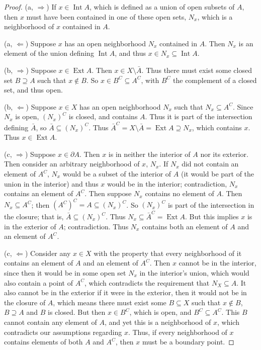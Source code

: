 \documentclass{article}
\theoremstyle{definition}
\begin{document}
\begin{proof}
(a, $\Rightarrow$) 
If $x \in \operatorname{Int} A$, which is defined as a 
union of open subsets of $A$, then $x$ must have been contained in one of 
these open sets, $N_x$, which is a neighborhood of $x$ contained in $A$.

(a, $\Leftarrow$) 
Suppose $x$ has an open neighborhood $N_x$ contained in $A$. 
Then $N_x$ is an element of the union defining $\operatorname{Int} A$, and 
thus $ x \in N_x \subseteq \operatorname{Int} A$.

(b, $\Rightarrow$)
Suppose $x \in \operatorname{Ext} A$. Then $x \in X \setminus \bar{A}$. Thus
there must exist some closed set $B \supseteq A$ such that $x \not\in B$.
So $x \in B^C \subseteq A^C$, with $B^C$ the complement of a closed set, and thus
open.

(b, $\Leftarrow$)
Suppose $x \in X$ has an open neighborhood $N_x$ such that $N_x \subseteq A^C$. 
Since $N_x$ is open, $(N_x)^C$ is closed, and contains $A$. Thus it is part
of the intersection defining $\bar{A}$, so
$\bar{A} \subseteq (N_x)^C$. Thus $\bar{A}^C = X \setminus \bar{A} 
=\operatorname{Ext} A \supseteq N_x$, which contains $x$. Thus
$x \in \operatorname{Ext} A$.

(c, $\Rightarrow$)
Suppose $x \in \partial A$. Then $x$ is in neither the interior of $A$ nor
its exterior. Then consider an arbitrary neighborhood of $x$, $N_x$. If 
$N_x$ did not contain an element of $A^C$, $N_x$ would be a subset
of the interior of $A$ (it would be part of the union in the interior) 
and thus $x$ would be in the interior; contradiction, $N_x$ contains
an element of $A^C$. Then suppose $N_x$ contains no element of $A$. Then 
$N_x \subseteq A^C$; then $(A^C)^C = A \subseteq (N_x)^C$. So $(N_x)^C$
is part of the intersection in the closure; that is, 
$\bar{A} \subseteq (N_x)^C$. Thus $N_x \subseteq \bar{A}^C =
\operatorname{Ext} A$. But this implies $x$ is in the exterior of $A$;
contradiction. Thus $N_x$ contains both an element of $A$ and an element of
$A^C$.

(c, $\Leftarrow$)
Consider any $x \in X$ with the property that every neighborhood of it contains
an element of $A$ and an element of $A^C$. Then $x$ cannot be in the interior,
since then it would be in some open set $N_x$ in the interior's union, which
would also contain a point of $A^C$, which contradicts the requirement that
$N_X \subseteq A$. It also cannot be in the exterior if it were in the exterior,
then it would not be in the closure of $A$, which means there must exist some
$B \subseteq X$ such that $x\not\in B$, $B \supseteq A$ and $B$ is closed.
But then $x \in B^C$, which is open, and $B^C \subseteq A^C$. This $B$ cannot
contain any element of $A$, and yet this is a neighborhood of $x$, which 
contradicts our assumptions regarding $x$. Thus, if every neighborhood of
$x$ contains elements of both $A$ and $A^C$, then $x$ must be a boundary point.


\end{proof}
\end{document}
